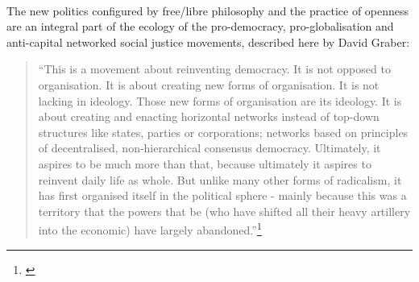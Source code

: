 \documentclass[11pt,titlepage]{book}
\begin{document}
\paragraph{}The new politics configured by free/libre philosophy and the practice of openness are an integral part of the ecology of the pro-democracy, pro-globalisation and anti-capital networked social justice movements, described here by David Graber:
\begin{quote}``This is a movement about reinventing democracy. It is not opposed to organisation. It is about creating new forms of organisation. It is not lacking in ideology. Those new forms of organisation are its ideology. It is about creating and enacting horizontal networks instead of top-down structures like states, parties or corporations; networks based on principles of decentralised, non-hierarchical consensus democracy. Ultimately, it aspires to be much more than that, because ultimately it aspires to reinvent daily life as whole. But unlike many other forms of radicalism, it has first organised itself in the political sphere - mainly because this was a territory that the powers that be (who have shifted all their heavy artillery into the economic) have largely abandoned.''\footnote{\cite{Graeber:2002}}
\end{quote}
\end{document}
